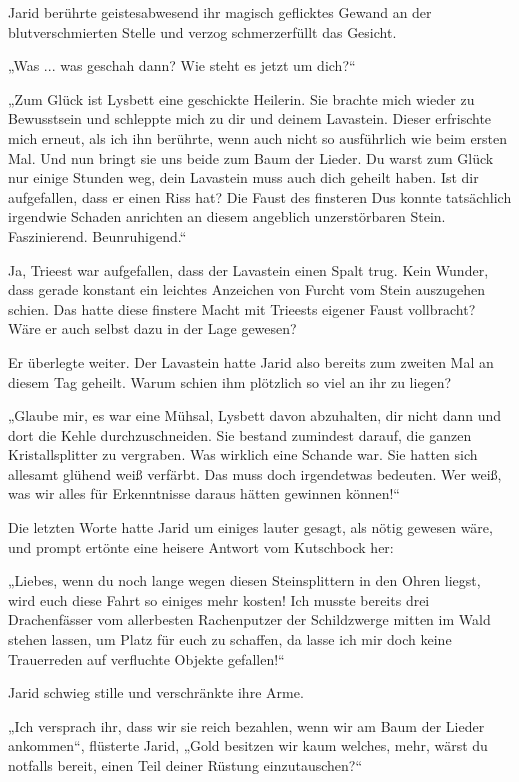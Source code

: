 Jarid berührte geistesabwesend ihr magisch geflicktes Gewand an der blutverschmierten Stelle und verzog schmerzerfüllt das Gesicht.

„Was ... was geschah dann? Wie steht es jetzt um dich?“

„Zum Glück ist Lysbett eine geschickte Heilerin. Sie brachte mich wieder zu Bewusstsein und schleppte mich zu dir und deinem Lavastein. Dieser erfrischte mich erneut, als ich ihn berührte, wenn auch nicht so ausführlich wie beim ersten Mal. Und nun bringt sie uns beide zum Baum der Lieder. Du warst zum Glück nur einige Stunden weg, dein Lavastein muss auch dich geheilt haben. Ist dir aufgefallen, dass er einen Riss hat? Die Faust des finsteren Dus konnte tatsächlich irgendwie Schaden anrichten an diesem angeblich unzerstörbaren Stein. Faszinierend. Beunruhigend.“

Ja, Trieest war aufgefallen, dass der Lavastein einen Spalt trug. Kein Wunder, dass gerade konstant ein leichtes Anzeichen von Furcht vom Stein auszugehen schien. Das hatte diese finstere Macht mit Trieests eigener Faust vollbracht? Wäre er auch selbst dazu in der Lage gewesen?

Er überlegte weiter. Der Lavastein hatte Jarid also bereits zum zweiten Mal an diesem Tag geheilt. Warum schien ihm plötzlich so viel an ihr zu liegen?

„Glaube mir, es war eine Mühsal, Lysbett davon abzuhalten, dir nicht dann und dort die Kehle durchzuschneiden. Sie bestand zumindest darauf, die ganzen Kristallsplitter zu vergraben. Was wirklich eine Schande war. Sie hatten sich allesamt glühend weiß verfärbt. Das muss doch irgendetwas bedeuten. Wer weiß, was wir alles für Erkenntnisse daraus hätten gewinnen können!“

Die letzten Worte hatte Jarid um einiges lauter gesagt, als nötig gewesen wäre, und prompt ertönte eine heisere Antwort vom Kutschbock her:

„Liebes, wenn du noch lange wegen diesen Steinsplittern in den Ohren liegst, wird euch diese Fahrt so einiges mehr kosten! Ich musste bereits drei Drachenfässer vom allerbesten Rachenputzer der Schildzwerge mitten im Wald stehen lassen, um Platz für euch zu schaffen, da lasse ich mir doch keine Trauerreden auf verfluchte Objekte gefallen!“

Jarid schwieg stille und verschränkte ihre Arme.

„Ich versprach ihr, dass wir sie reich bezahlen, wenn wir am Baum der Lieder ankommen“, flüsterte Jarid, „Gold besitzen wir kaum welches, mehr, wärst du notfalls bereit, einen Teil deiner Rüstung einzutauschen?“

